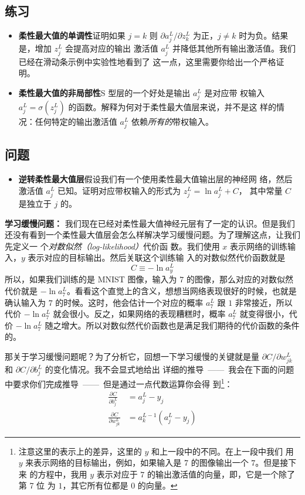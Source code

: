 \subsection*{练习}

\begin{itemize}
\item \textbf{柔性最大值的单调性}\quad 证明如果 $j=k$ 则 $\partial a^L_j /
  \partial z^L_k$ 为正，$j \neq k$ 时为负。结果是，增加 $z^L_j$ 会提高对应的输出
  激活值 $a^L_j$ 并降低其他所有输出激活值。我们已经在滑动条示例中实验性地看到了
  这一点，这里需要你给出一个严格证明。
\item \textbf{柔性最大值的非局部性}\quad S 型层的一个好处是输出 $a^L_j$ 是对应带
  权输入 $a^L_j = \sigma(z^L_j)$ 的函数。解释为何对于柔性最大值层来说，并不是这
  样的情况：任何特定的输出激活值 $a^L_j$ 依赖\emph{所有的}带权输入。
\end{itemize}

\subsection*{问题}

\begin{itemize}
\item \textbf{逆转柔性最大值层}\quad 假设我们有一个使用柔性最大值输出层的神经网
  络，然后激活值 $a^L_j$ 已知。证明对应带权输入的形式为 $z^L_j = \ln a^L_j + C$，
  其中常量 $C$ 是独立于 $j$ 的。
\end{itemize}

\textbf{学习缓慢问题：} 我们现在已经对柔性最大值神经元层有了一定的认识。但是我们
还没有看到一个柔性最大值层会怎么样解决学习缓慢问题。为了理解这点，让我们先定义一
个\emph{对数似然（log-likelihood）}代价函
数。我们使用 $x$ 表示网络的训练输入，$y$ 表示对应的目标输出。然后关联这个训练输
入的对数似然代价函数就是
\begin{equation}
  C \equiv -\ln a^L_y
  \label{eq:80}\tag{80}
\end{equation}
所以，如果我们训练的是 MNIST 图像，输入为 $7$ 的图像，那么对应的对数似然代价就是
$-\ln a_7^L$。看看这个直觉上的含义，想想当网络表现很好的时候，也就是确认输入为
$7$ 的时候。这时，他会估计一个对应的概率 $a_7^L$ 跟 $1$ 非常接近，所以代价 $-\ln
a_7^L$ 就会很小。反之，如果网络的表现糟糕时，概率 $a_7^L$ 就变得很小，代价 $-\ln
a_7^L$ 随之增大。所以对数似然代价函数也是满足我们期待的代价函数的条件的。

那关于学习缓慢问题呢？为了分析它，回想一下学习缓慢的关键就是量 $\partial C /
\partial w^L_{jk}$ 和 $\partial C / \partial b^L_j$ 的变化情况。我不会显式地给出
详细的推导~——~我会在下面的问题中要求你们完成推导~——~但是通过一点代数运算你会得
到\footnote{注意这里的表示上的差异，这里的 $y$ 和上一段中的不同。在上一段中我们
  用 $y$ 来表示网络的目标输出，例如，如果输入是 7 的图像输出一个 $7$。但是接下来
  的方程中，我用 $y$ 表示对应于 $7$ 的输出激活值的向量，即，它是一个除了第 7 位
  为 $1$，其它所有位都是 $0$ 的向量。}：
\begin{align}
  \frac{\partial C}{\partial b^L_j} &= a^L_j-y_j \label{eq:81}\tag{81}\\
  \frac{\partial C}{\partial w^L_{jk}} &= a^{L-1}_k (a^L_j-y_j) \label{eq:82}\tag{82}
\end{align}

